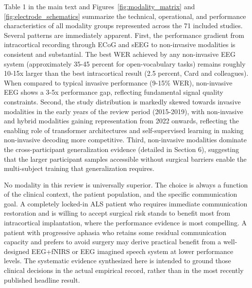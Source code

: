 Table 1 in the main text and Figures~\ref{fig:modality_matrix} and \ref{fig:electrode_schematics} summarize the technical, operational, and performance characteristics of all modality groups represented across the 71 included studies. Several patterns are immediately apparent. First, the performance gradient from intracortical recording through ECoG and sEEG to non-invasive modalities is consistent and substantial. The best WER achieved by any non-invasive EEG system (approximately 35-45 percent for open-vocabulary tasks) remains roughly 10-15x larger than the best intracortical result (2.5 percent, Card and colleagues). When compared to typical invasive performance (9-15\% WER), non-invasive EEG shows a 3-5x performance gap, reflecting fundamental signal quality constraints. Second, the study distribution is markedly skewed towards invasive modalities in the early years of the review period (2015-2019), with non-invasive and hybrid modalities gaining representation from 2022 onwards, reflecting the enabling role of transformer architectures and self-supervised learning in making non-invasive decoding more competitive. Third, non-invasive modalities dominate the cross-participant generalization evidence (detailed in Section 6), suggesting that the larger participant samples accessible without surgical barriers enable the multi-subject training that generalization requires.

No modality in this review is universally superior. The choice is always a function of the clinical context, the patient population, and the specific communication goal. A completely locked-in ALS patient who requires immediate communication restoration and is willing to accept surgical risk stands to benefit most from intracortical implantation, where the performance evidence is most compelling. A patient with progressive aphasia who retains some residual communication capacity and prefers to avoid surgery may derive practical benefit from a well-designed EEG+fNIRS or EEG imagined speech system at lower performance levels. The systematic evidence synthesized here is intended to ground those clinical decisions in the actual empirical record, rather than in the most recently published headline result.

